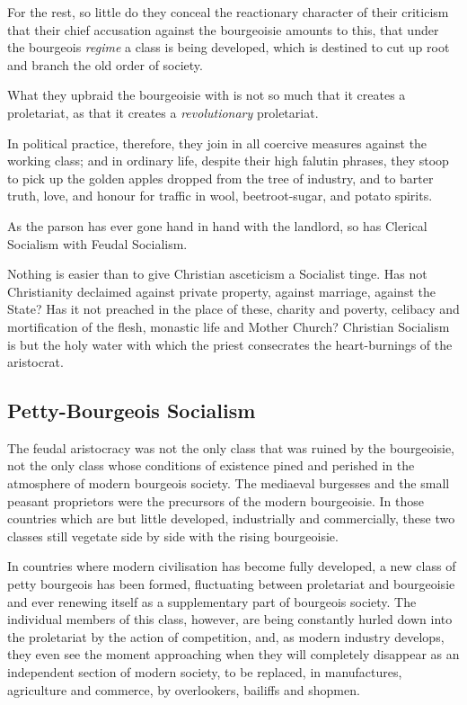 For the rest, so little do they conceal the reactionary character of
their criticism that their chief accusation against the bourgeoisie
amounts to this, that under the bourgeois \textit{regime} a class is being
developed, which is destined to cut up root and branch the old order of
society.

What they upbraid the bourgeoisie with is not so much that it creates a
proletariat, as that it creates a \textit{revolutionary} proletariat.

In political practice, therefore, they join in all coercive measures
against the working class; and in ordinary life, despite their high
falutin phrases, they stoop to pick up the golden apples dropped from
the tree of industry, and to barter truth, love, and honour for traffic
in wool, beetroot-sugar, and potato spirits.

As the parson has ever gone hand in hand with the landlord, so has
Clerical Socialism with Feudal Socialism.

Nothing is easier than to give Christian asceticism a Socialist tinge.
Has not Christianity declaimed against private property, against
marriage, against the State? Has it not preached in the place of these,
charity and poverty, celibacy and mortification of the flesh, monastic
life and Mother Church? Christian Socialism is but the holy water with
which the priest consecrates the heart-burnings of the aristocrat.

\subsection*{Petty-Bourgeois Socialism}


The feudal aristocracy was not the only class that was ruined by the
bourgeoisie, not the only class whose conditions of existence pined and
perished in the atmosphere of modern bourgeois society. The mediaeval
burgesses and the small peasant proprietors were the precursors of the
modern bourgeoisie. In those countries which are but little developed,
industrially and commercially, these two classes still vegetate side by
side with the rising bourgeoisie.

In countries where modern civilisation has become fully developed, a
new class of petty bourgeois has been formed, fluctuating between
proletariat and bourgeoisie and ever renewing itself as a supplementary
part of bourgeois society. The individual members of this class,
however, are being constantly hurled down into the proletariat by the
action of competition, and, as modern industry develops, they even see
the moment approaching when they will completely disappear as an
independent section of modern society, to be replaced, in manufactures,
agriculture and commerce, by overlookers, bailiffs and shopmen.

